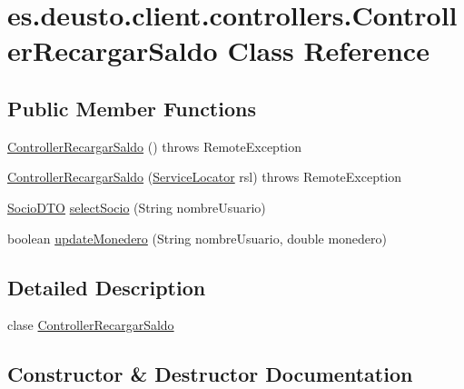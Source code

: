 \hypertarget{classes_1_1deusto_1_1client_1_1controllers_1_1_controller_recargar_saldo}{}\section{es.\+deusto.\+client.\+controllers.\+Controller\+Recargar\+Saldo Class Reference}
\label{classes_1_1deusto_1_1client_1_1controllers_1_1_controller_recargar_saldo}
\subsection*{Public Member Functions}
\begin{DoxyCompactItemize}
\item 
\mbox{\hyperlink{classes_1_1deusto_1_1client_1_1controllers_1_1_controller_recargar_saldo_ae079681e14d2e917409c8f8ce6e90fa4}{Controller\+Recargar\+Saldo}} ()  throws Remote\+Exception 
\item 
\mbox{\hyperlink{classes_1_1deusto_1_1client_1_1controllers_1_1_controller_recargar_saldo_a40fae2159dce1094140f0fc1c84735e8}{Controller\+Recargar\+Saldo}} (\mbox{\hyperlink{classes_1_1deusto_1_1client_1_1remote_1_1_service_locator}{Service\+Locator}} rsl)  throws Remote\+Exception 
\item 
\mbox{\hyperlink{classes_1_1deusto_1_1server_1_1dto_1_1_socio_d_t_o}{Socio\+D\+TO}} \mbox{\hyperlink{classes_1_1deusto_1_1client_1_1controllers_1_1_controller_recargar_saldo_a511dfcf3a3b5e96e00eb71993a37b67f}{select\+Socio}} (String nombre\+Usuario)
\item 
boolean \mbox{\hyperlink{classes_1_1deusto_1_1client_1_1controllers_1_1_controller_recargar_saldo_a050acee8a571b3d9ae4eaf191ddfd596}{update\+Monedero}} (String nombre\+Usuario, double monedero)
\end{DoxyCompactItemize}


\subsection{Detailed Description}
clase \mbox{\hyperlink{classes_1_1deusto_1_1client_1_1controllers_1_1_controller_recargar_saldo}{Controller\+Recargar\+Saldo}} 

\subsection{Constructor \& Destructor Documentation}
\mbox{\label{classes_1_1deusto_1_1client_1_1controllers_1_1_controller_recargar_saldo_ae079681e14d2e917409c8f8ce6e90fa4}} 
